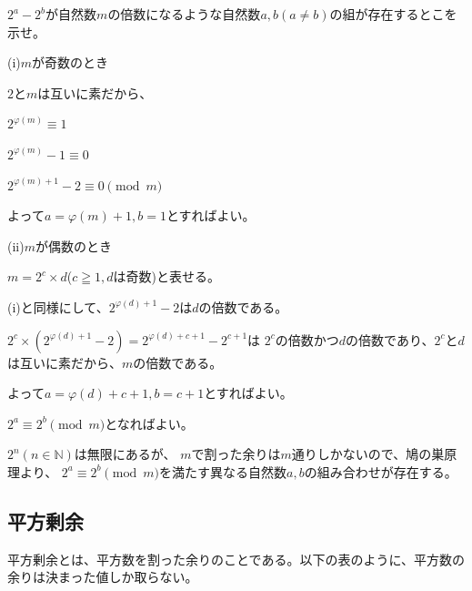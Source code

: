 \documentclass[uplatex,dvipdfmx]{jsbook}
\begin{document}
\begin{problem}[練習問題]
    $2^a-2^b$が自然数$m$の倍数になるような自然数$a,b\left(a\neq b\right)$の組が存在するとこを示せ。
\end{problem}

\begin{answer}
    (i)$m$が奇数のとき

    $2$と$m$は互いに素だから、

    $2^{\varphi\left(m\right)} \equiv 1$

    $2^{\varphi\left(m\right)}-1 \equiv 0$

    $2^{\varphi\left(m\right)+1}-2 \equiv 0\pmod m$

    よって$a=\varphi\left(m\right)+1,b=1$とすればよい。

    (i\hspace{-1pt}i)$m$が偶数のとき

    $m=2^c\times d$($c\geqq 1,d$は奇数)と表せる。

    (i)と同様にして、$2^{\varphi\left(d\right)+1}-2$は$d$の倍数である。

    $2^c\times\left(2^{\varphi\left(d\right)+1}-2\right)=2^{\varphi\left(d\right)+c+1}-2^{c+1}$は
    $2^c$の倍数かつ$d$の倍数であり、$2^c$と$d$は互いに素だから、$m$の倍数である。

    よって$a=\varphi\left(d\right)+c+1,b=c+1$とすればよい。
\end{answer}

\begin{answer}[別解]
    $2^a\equiv 2^b \pmod m$となればよい。

    $2^n\left(n\in\mathbb{N}\right)$は無限にあるが、
    $m$で割った余りは$m$通りしかないので、鳩の巣原理より、
    $2^a\equiv 2^b \pmod m$を満たす異なる自然数$a,b$の組み合わせが存在する。
\end{answer}

\subsection{平方剰余}
平方剰余とは、平方数を割った余りのことである。以下の表のように、平方数の余りは決まった値しか取らない。
\end{document}
